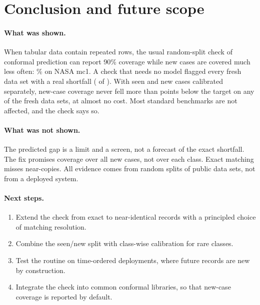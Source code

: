 \section{Conclusion and future scope}\label{sec:conclusion}

\paragraph{What was shown.} When tabular data contain repeated rows, the usual random-split check of conformal prediction can report 90\% coverage while new cases are covered much less often: \NCsMcOneNew{}\% on NASA mc1. A check that needs no model flagged every fresh data set with a real shortfall (\NScpHit{} of \NScpPos{}). With seen and new cases calibrated separately, new-case coverage never fell more than \NWTwoWorstFixAbs{} points below the target on any of the \NScpN{} fresh data sets, at almost no cost. Most standard benchmarks are not affected, and the check says so.

\paragraph{What was not shown.} The predicted gap is a limit and a screen, not a forecast of the exact shortfall. The fix promises coverage over all new cases, not over each class. Exact matching misses near-copies. All evidence comes from random splits of public data sets, not from a deployed system.

\paragraph{Next steps.}
\begin{enumerate}
\item Extend the check from exact to near-identical records with a principled choice of matching resolution.
\item Combine the seen/new split with class-wise calibration for rare classes.
\item Test the routine on time-ordered deployments, where future records are new by construction.
\item Integrate the check into common conformal libraries, so that new-case coverage is reported by default.
\end{enumerate}
